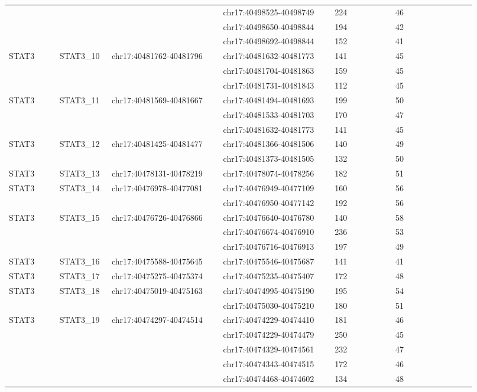 \begin{landscape}
\begin{longtable}{p{0.1\linewidth}|p{0.1\linewidth}p{0.22\linewidth}p{0.22\linewidth}p{0.12\linewidth}p{0.16\linewidth}}
 & & & chr17:40498525-40498749 & 224 & 46
\\
 & & & chr17:40498650-40498844 & 194 & 42
\\
 & & & chr17:40498692-40498844 & 152 & 41
\\
STAT3 & STAT3\_10 & chr17:40481762-40481796 & chr17:40481632-40481773 & 141 & 45
\\
 & & & chr17:40481704-40481863 & 159 & 45
\\
 & & & chr17:40481731-40481843 & 112 & 45
\\
STAT3 & STAT3\_11 & chr17:40481569-40481667 & chr17:40481494-40481693 & 199 & 50
\\
 & & & chr17:40481533-40481703 & 170 & 47
\\
 & & & chr17:40481632-40481773 & 141 & 45
\\
STAT3 & STAT3\_12 & chr17:40481425-40481477 & chr17:40481366-40481506 & 140 & 49
\\
 & & & chr17:40481373-40481505 & 132 & 50
\\
STAT3 & STAT3\_13 & chr17:40478131-40478219 & chr17:40478074-40478256 & 182 & 51
\\
STAT3 & STAT3\_14 & chr17:40476978-40477081 & chr17:40476949-40477109 & 160 & 56
\\
 & & & chr17:40476950-40477142 & 192 & 56
\\
STAT3 & STAT3\_15 & chr17:40476726-40476866 & chr17:40476640-40476780 & 140 & 58
\\
 & & & chr17:40476674-40476910 & 236 & 53
\\
 & & & chr17:40476716-40476913 & 197 & 49
\\
STAT3 & STAT3\_16 & chr17:40475588-40475645 & chr17:40475546-40475687 & 141 & 41
\\
STAT3 & STAT3\_17 & chr17:40475275-40475374 & chr17:40475235-40475407 & 172 & 48
\\
STAT3 & STAT3\_18 & chr17:40475019-40475163 & chr17:40474995-40475190 & 195 & 54
\\
 & & & chr17:40475030-40475210 & 180 & 51
\\
STAT3 & STAT3\_19 & chr17:40474297-40474514 & chr17:40474229-40474410 & 181 & 46
\\
 & & & chr17:40474229-40474479 & 250 & 45
\\
 & & & chr17:40474329-40474561 & 232 & 47
\\
 & & & chr17:40474343-40474515 & 172 & 46
\\
 & & & chr17:40474468-40474602 & 134 & 48
\\

\end{longtable}
\end{landscape}
